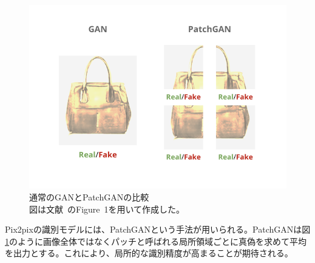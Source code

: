 \begin{figure}[t]
\begin{center}
\includegraphics[width=0.95\hsize]{figure/patchgan.png}
\caption{通常のGANとPatchGANの比較\\
図は文献~\cite{pix2pix}のFigure~1を用いて作成した。}
\label{fig:patchgan}
\end{center}
\end{figure}

Pix2pixの識別モデルには、PatchGANという手法が用いられる。PatchGANは図\ref{fig:patchgan}のように画像全体ではなくパッチと呼ばれる局所領域ごとに真偽を求めて平均を出力とする。これにより、局所的な識別精度が高まることが期待される。